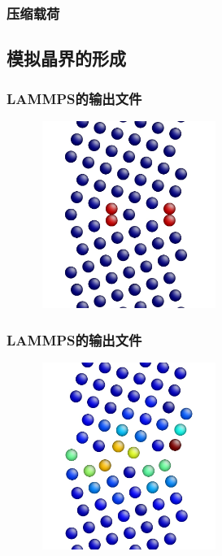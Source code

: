 \frame
{
	\frametitle{压缩载荷}
\begin{figure}[h!]
\centering
\vskip -5pt
\caption{\fontsize{6.2pt}{5.2pt}}%
\label{LAMMPS_Compression-Loading}
\end{figure}
}

\subsection{模拟晶界的形成}

\frame
{
	\frametitle{\textrm{LAMMPS}的输出文件}
\begin{figure}[h!]
\centering
\vskip -10pt
\includegraphics[height=2.40in,width=2.3in, viewport=0 0 780 890,clip]{Figures/Lammps-simulation_grain_boundary_structure-1.jpeg}
\caption{\fontsize{6.2pt}{5.2pt}}%
\label{LAMMPS_output-simulation_grain_boundary_structure-1}
\end{figure}
}

\frame
{
	\frametitle{\textrm{LAMMPS}的输出文件}
\begin{figure}[h!]
\centering
\vskip -10pt
\includegraphics[height=2.40in,width=2.3in, viewport=0 0 780 890,clip]{Figures/Lammps-simulation_grain_boundary_structure-2.jpeg}
\caption{\fontsize{6.2pt}{5.2pt}}%
\label{LAMMPS_output-simulation_grain_boundary_structure-2}
\end{figure}
}

